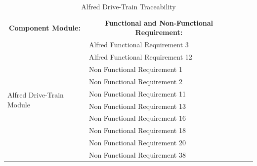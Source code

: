 \documentclass [10pt]{article}
\begin{document}
\begin{table}[h!]
\centering
\begin{tabular}{lllll}
\cline{1-2}
\multicolumn{1}{|c|}{\textbf{Component Module:}} & \multicolumn{1}{c|}{\textbf{Functional and Non-Functional Requirement:}} &  &  &  \\ \cline{1-2}
\multicolumn{1}{|l|}{\multirow{10}{*}{Alfred Drive-Train Module}} & \multicolumn{1}{l|}{Alfred Functional Requirement 3} &  &  &  \\ \cline{2-2}
\multicolumn{1}{|l|}{} & \multicolumn{1}{l|}{Alfred Functional Requirement 12} &  &  &  \\ \cline{2-2}
\multicolumn{1}{|l|}{} & \multicolumn{1}{l|}{Non Functional Requirement 1} &  &  &  \\ \cline{2-2}
\multicolumn{1}{|l|}{} & \multicolumn{1}{l|}{Non Functional Requirement 2} &  &  &  \\ \cline{2-2}
\multicolumn{1}{|l|}{} & \multicolumn{1}{l|}{Non Functional Requirement 11} &  &  &  \\ \cline{2-2}
\multicolumn{1}{|l|}{} & \multicolumn{1}{l|}{Non Functional Requirement 13} &  &  &  \\ \cline{2-2}
\multicolumn{1}{|l|}{} & \multicolumn{1}{l|}{Non Functional Requirement 16} &  &  &  \\ \cline{2-2}
\multicolumn{1}{|l|}{} & \multicolumn{1}{l|}{Non Functional Requirement 18} &  &  &  \\ \cline{2-2}
\multicolumn{1}{|l|}{} & \multicolumn{1}{l|}{Non Functional Requirement 20} &  &  &  \\ \cline{2-2}
\multicolumn{1}{|l|}{} & \multicolumn{1}{l|}{Non Functional Requirement 38} &  &  &  \\ \cline{1-2}
\end{tabular}
\caption{Alfred Drive-Train Traceability}
\end{table}
\end{document}
